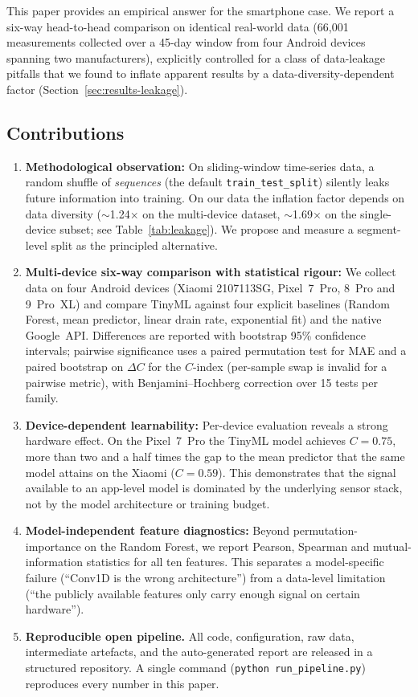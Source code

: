 \documentclass[conference]{IEEEtran}
\begin{document}
This paper provides an empirical answer for the smartphone case. We
report a six-way head-to-head comparison on identical real-world data
(66{,}001 measurements collected over a 45-day window from four
Android devices spanning two manufacturers), explicitly controlled
for a class of data-leakage pitfalls that we found to inflate
apparent results by a data-diversity-dependent factor
(Section~\ref{sec:results-leakage}).

\subsection*{Contributions}
\begin{enumerate}
\item \textbf{Methodological observation:} On sliding-window time-series
data, a random shuffle of \emph{sequences} (the default
\texttt{train\_test\_split}) silently leaks future information into
training. On our data the inflation factor depends on data
diversity ($\sim$1.24$\times$ on the multi-device dataset,
$\sim$1.69$\times$ on the single-device subset; see
Table~\ref{tab:leakage}). We propose and measure a segment-level
split as the principled alternative.

\item \textbf{Multi-device six-way comparison with statistical rigour:}
We collect data on four Android devices (Xiaomi 2107113SG, Pixel~7~Pro,
8~Pro and 9~Pro~XL) and compare TinyML against four explicit baselines
(Random Forest, mean predictor, linear drain rate, exponential fit) and
the native Google~API. Differences are reported with bootstrap 95\%
confidence intervals; pairwise significance uses a paired permutation
test for MAE and a paired bootstrap on $\Delta C$ for the $C$-index
(per-sample swap is invalid for a pairwise metric), with
Benjamini--Hochberg correction over 15 tests per family.

\item \textbf{Device-dependent learnability:} Per-device evaluation
reveals a strong hardware effect. On the Pixel~7~Pro the TinyML model
achieves $C{=}0.75$, more than two and a half times the gap to the
mean predictor that the same model attains on the Xiaomi
($C{=}0.59$). This demonstrates that the signal available to an
app-level model is dominated by the underlying sensor stack, not by
the model architecture or training budget.

\item \textbf{Model-independent feature diagnostics:} Beyond
permutation-importance on the Random Forest, we report Pearson, Spearman
and mutual-information statistics for all ten features. This separates a
model-specific failure (``Conv1D is the wrong architecture'') from a
data-level limitation (``the publicly available features only carry
enough signal on certain hardware'').

\item \textbf{Reproducible open pipeline.} All code, configuration, raw
data, intermediate artefacts, and the auto-generated report are released
in a structured repository. A single command
(\texttt{python run\_pipeline.py}) reproduces every number in this paper.
\end{enumerate}
\end{document}

